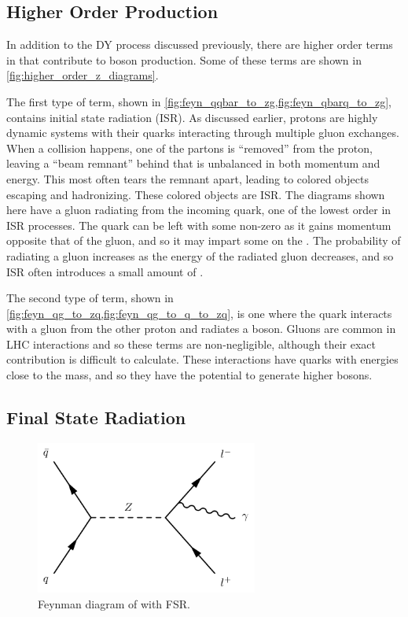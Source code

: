 \subsection{Higher Order Production}
\label{ssec:higher_order}

In addition to the DY process discussed previously, there are higher order
terms in \alphastrong that contribute to \Z boson production. Some of these
terms are shown in \cref{fig:higher_order_z_diagrams}.

The first type of term, shown in
\cref{fig:feyn_qqbar_to_zg,fig:feyn_qbarq_to_zg}, contains initial state
radiation (ISR). As discussed earlier, protons are highly dynamic systems with
their quarks interacting through multiple gluon exchanges. When a collision
happens, one of the partons is ``removed'' from the proton, leaving a ``beam
remnant'' behind that is unbalanced in both momentum and energy. This most
often tears the remnant apart, leading to colored objects escaping and
hadronizing. These colored objects are ISR. The diagrams shown here have a
gluon radiating from the incoming quark, one of the lowest order in
\alphastrong ISR processes. The quark can be left with some non-zero \pt as it
gains momentum opposite that of the gluon, and so it may impart some \bosonpt
on the \Z. The probability of radiating a gluon increases as the energy of the
radiated gluon decreases, and so ISR often introduces a small amount of
\bosonpt.

The second type of term, shown in
\cref{fig:feyn_qg_to_zq,fig:feyn_qg_to_q_to_zq}, is one where the quark
interacts with a gluon from the other proton and radiates a \Z boson. Gluons
are common in LHC interactions and so these terms are non-negligible, although
their exact contribution is difficult to calculate. These interactions have
quarks with energies close to the \Z mass, and so they have the potential to
generate higher \pt \Z bosons.



\subsection{Final State Radiation}
\label{sec:electron_dressing}

\begin{figure}[!htb]
    \centering
    \includegraphics[width=0.65\textwidth]{figures/fsr.pdf}
    \caption{
        Feynman diagram of \Ztoll with FSR.
    }
    \label{fig:fsr_diagram}
\end{figure}

